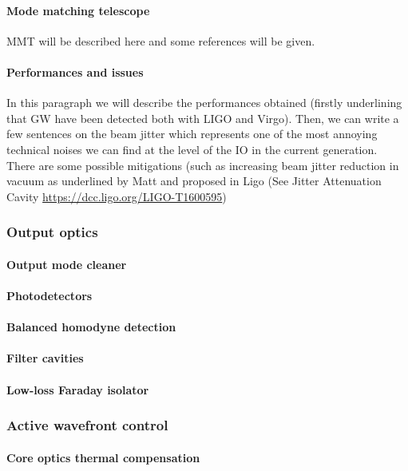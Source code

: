 \paragraph{Mode matching telescope}
MMT will be described here and some references will be given.

\paragraph {Performances and issues}
 In this paragraph we will describe the performances obtained (firstly underlining that GW have been detected both with LIGO and Virgo). Then, we can write a few sentences on the beam jitter which represents one of the most annoying technical noises we can find at the level of the IO in the current generation. There are some possible mitigations (such as increasing beam jitter reduction in vacuum as underlined by Matt and proposed in Ligo (See Jitter Attenuation Cavity \url{https://dcc.ligo.org/LIGO-T1600595})

\subsubsection{Output optics}
\paragraph {Output mode cleaner}
\paragraph{Photodetectors}
\paragraph{Balanced homodyne detection}
\paragraph{Filter cavities}
\paragraph{Low-loss Faraday isolator}

\subsubsection{Active wavefront control}
\paragraph{Core optics thermal compensation}
